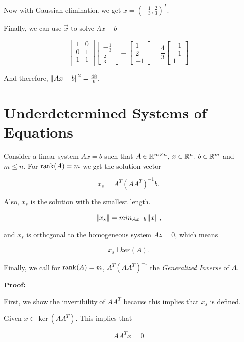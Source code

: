 Now with Gaussian elimination we get \(x = (-\frac{1}{3}, \frac{2}{3})^T\). 

Finally, we can use \(\vec{x}\) to solve \(Ax - b\)

\[
	\begin{bmatrix}
		1 & 0 \\
		0 & 1 \\
		1 & 1 \\
	\end{bmatrix}
	\begin{bmatrix}
		-\frac{1}{3} \\
		\frac{2}{3}
	\end{bmatrix}
	-
	\begin{bmatrix}
		1 \\
		2 \\
		-1
	\end{bmatrix}
	=
	\frac{4}{3}
	\begin{bmatrix}
	-1 \\
	-1 \\
	1
	\end{bmatrix}
\]

And therefore, \(\left\| Ax - b \right\|^2 = \frac{48}{9}\).

\section{Underdetermined Systems of Equations}

Consider a linear system \(Ax = b\) such that \(A \in \mathbb{R}^{m \times n}\), \(x\in \mathbb{R}^n\), 
\(b \in \mathbb{R}^m\) and \(m \le n\). For \(\mathrm{rank}(A) = m\) we get the solution vector

\[
	x_s = A^T {(A A^T)}^{-1} b.
\]

Also, \(x_s\) is the solution with the smallest length. 

\[
	\left\| x_s \right\| = min_{Ax = b} \left\| x \right\|,
\] 

and \(x_s\) is orthogonal to the homogeneous system \(Az = 0\), which means

\[
	x_s \bot ker(A).
\]

Finally, we call for  \(\mathrm{rank}(A) = m\), \(A^T {(A A^T)}^{-1}\) the \emph{Generalized Inverse} of \(A\).

\textbf{Proof:}

First, we show the invertibility of \(AA^T\) because this implies that \(x_s\) is defined.

Given \(x \in \ker(AA^T)\). This implies that 

\[
	AA^T x = 0	
\] 

